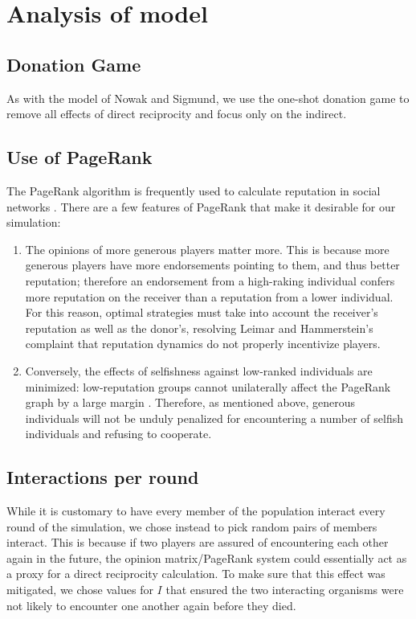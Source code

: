 \documentclass{amsart}
\begin{document}
\section{Analysis of model}
\label{sec:analysis}
\subsection{Donation Game}
As with the model of Nowak and Sigmund, we use the one-shot donation game to remove all effects of direct reciprocity and focus only on the indirect. 

\subsection{Use of PageRank}
\label{sec:whypagerank}

The PageRank algorithm is frequently used to calculate reputation in
social networks \cite{pujol_extracting_2002}. There are a few features
of PageRank that make it desirable for our simulation:
\begin{enumerate}
\item
The opinions of more generous players matter more. This is because
more generous players have more endorsements pointing to them, and
thus better reputation; therefore an endorsement from a high-raking
individual confers more reputation on the receiver than a reputation
from a lower individual. For this reason, optimal strategies must take
into account the receiver's reputation as well as the donor's,
resolving Leimar and Hammerstein's complaint
\cite{leimar_evolution_2001} that reputation dynamics do not properly
incentivize players.
\item
Conversely, the effects of selfishness against low-ranked individuals
are minimized: low-reputation groups cannot unilaterally affect the
PageRank graph by a large margin
\cite{langville_deeper_2004}. Therefore, as mentioned above, generous
individuals will not be unduly penalized for encountering a number of
selfish individuals and refusing to cooperate.
\end{enumerate}

\subsection{Interactions per round}

While it is customary to have every member of the population interact
every round of the simulation, we chose instead to pick random pairs
of members interact. This is because if two players are assured of
encountering each other again in the future, the opinion
matrix/PageRank system could essentially act as a proxy for a direct
reciprocity calculation. To make sure that this effect was mitigated,
we chose values for $I$ that ensured the two interacting organisms
were not likely to encounter one another again before they died.
\end{document}
